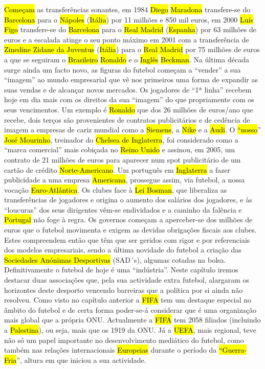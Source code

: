 \documentclass[a4paper,12pt]{article}
\begin{document}
 \hl{Começam} as transferências sonantes, em 1984 \hl{Diego} \hl{Maradona} transfere-se do \hl{Barcelona} para o \hl{Nápoles} (\hl{Itália}) por 11 milhões e 850 mil euros, em 2000 \hl{Luís Figo} transfere-se do \hl{Barcelona} para o \hl{Real Madrid} (\hl{Espanha}) por 63 milhões de euros e a escalada atinge o seu ponto máximo em 2001 com a transferência de \hl{Zinedine Zidane da Juventus} (\hl{Itália}) para o \hl{Real Madrid} por 75 milhões de euros a que se seguiram o \hl{Brasileiro} \hl{Ronaldo} e o \hl{Inglês} \hl{Beckman}.
 Na última década surge ainda um facto novo, as figuras do futebol começam a “vender” a sua “imagem” ao mundo empresarial que vê nos primeiros uma forma de expandir as suas vendas e de alcançar novos mercados. Os jogadores de “1ª linha” recebem hoje em dia mais com os direitos da sua “imagem” do que propriamente com os seus vencimentos.
Um exemplo é \hl{Ronaldo} que dos 26 milhões de euros/ano que recebe, dois terços são provenientes de contratos publicitários e de cedência de imagem a empresas de cariz mundial como a \hl{Siemens}, a \hl{Nike} e a \hl{Audi}. O \hl{“nosso}” \hl{José Mourinho}, treinador do \hl{Chelsea de Inglaterra}, foi considerado como a “marca comercial” mais cobiçada no \hl{Reino Unido} e assinou, em 2005, um contrato de 21 milhões de euros para aparecer num spot publicitário de um cartão de crédito \hl{Norte-Americano}. Um português em \hl{Inglaterra} a fazer publicidade a uma empresa \hl{Americana}, prossegue assim, via futebol, a nossa vocação \hl{Euro-Atlântica}.
 Os clubes face à \hl{Lei Bosman}, que liberaliza as transferências de jogadores e origina o aumento dos salários dos jogadores, e às “loucuras” dos seus dirigentes vêm-se endividados e a caminho da falência e \hl{Portugal} não foge à regra. Os governos começam a aperceber-se dos milhões de euros que o futebol movimenta e exigem as devidas obrigações fiscais aos clubes. Estes compreendem então que têm que ser geridos com rigor e por referenciais dos modelos empresariais, sendo a última novidade do futebol a criação das \hl{Sociedades Anónimas Desportivas} (SAD´s), algumas cotadas na bolsa.
 Definitivamente o futebol de hoje é uma “indústria”.
 Neste capítulo iremos destacar duas associações que, pela sua actividade extra futebol, alargaram os horizontes deste desporto vencendo barreiras que a política por si ainda não resolveu. Como visto no capítulo anterior a \hl{FIFA} tem um destaque especial no âmbito do futebol e de certa forma poder-se-á considerar que é uma organização mais global que a própria ONU. Actualmente a \hl{FIFA} tem 2058 filiados (incluindo a \hl{Palestina}), ou seja, mais que os 1919 da ONU. Já a \hl{UEFA}, mais regional, teve não só um papel importante no desenvolvimento mediático do futebol, como também nas relações internacionais \hl{Europeias} durante o período da \hl{“Guerra-Fria}”, altura em que iniciou a sua actividade.
\end{document}
